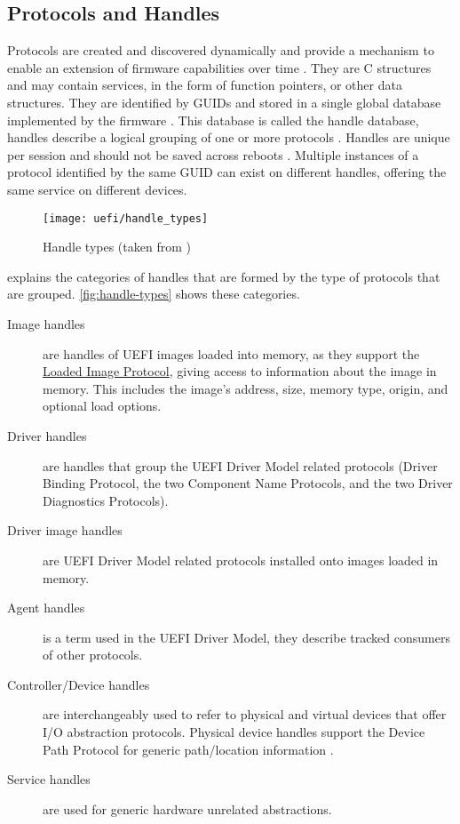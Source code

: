 \subsection{Protocols and Handles}

Protocols are created and discovered dynamically and provide a mechanism to enable an extension of firmware capabilities over time \cite[Section 3.6]{tianocore-edk2-driver-writer-s-guide}.
They are C structures and may contain services, in the form of function pointers, or other data structures.
They are identified by \acp{GUID} and stored in a single global database implemented by the firmware \cite{beyond-bios}.
This database is called the handle database, handles describe a logical grouping of one or more protocols \cite[Section 3.6]{tianocore-edk2-driver-writer-s-guide}.
Handles are unique per session and should not be saved across reboots \cite{beyond-bios}.
Multiple instances of a protocol identified by the same \ac{GUID} can exist on different handles, offering the same service on different devices.

\begin{figure}[htb]%
    \centering%
    \texttt{[image: uefi/handle\_types]}%
    \caption[Handle types]{Handle types (taken from \cite[Figure 3]{tianocore-edk2-driver-writer-s-guide})}%
    \label{fig:handle-types}%
\end{figure}

\cite{tianocore-edk2-driver-writer-s-guide} explains the categories of handles that are formed by the type of protocols that are grouped. \autoref{fig:handle-types} shows these categories.

\begin{description}
    \item[Image handles] are handles of \ac{UEFI} images loaded into memory, as they support the \hyperref[lst:loaded-image-protocol]{Loaded Image Protocol}, giving access to information about the image in memory. This includes the image's address, size, memory type, origin, and optional load options.
    \item[Driver handles] are handles that group the \ac{UEFI} Driver Model related protocols (Driver Binding Protocol, the two Component Name Protocols, and the two Driver Diagnostics Protocols).
    \item[Driver image handles] are \ac{UEFI} Driver Model related protocols installed onto images loaded in memory.
    \item[Agent handles] is a term used in the \ac{UEFI} Driver Model, they describe tracked consumers of other protocols.
    \item[Controller/Device handles] are interchangeably used to refer to physical and virtual devices that offer \ac{I/O} abstraction protocols.
        Physical device handles support the Device Path Protocol for generic path/location information \cite[Section 10.2]{uefi-spec}.
    \item[Service handles] are used for generic hardware unrelated abstractions.
\end{description}

